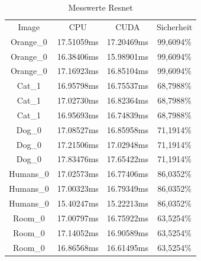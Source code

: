 \begin{table}[H]
	\centering
		\begin{tabular} {c c c c}
	Image & CPU & CUDA & Sicherheit \\
Orange\_0&	17.51059ms  &	17.20469ms&	99,6094\%\\
Orange\_0&	16.38406ms  &	15.98901ms&	99,6094\%\\
Orange\_0&	17.16923ms  &	16.85104ms&	99,6094\%\\
Cat\_1&	16.95798ms  &	16.75537ms&	68,7988\%\\
Cat\_1&	17.02730ms  &	16.82364ms&	68,7988\%\\
Cat\_1&	16.95693ms  &	16.74839ms&	68,7988\%\\
Dog\_0&	17.08527ms  &	16.85958ms&	71,1914\%\\
Dog\_0&	17.21506ms  &	17.02948ms&	71,1914\%\\
Dog\_0&	17.83476ms  &	17.65422ms&	71,1914\%\\
Humans\_0&	17.02573ms  &	16.77406ms&	86,0352\%\\
Humans\_0&	17.00323ms  &	16.79349ms&	86,0352\%\\
Humans\_0&	15.40247ms  &	15.22213ms&	86,0352\%\\
Room\_0&	17.00797ms  &	16.75922ms&	63,5254\%\\
Room\_0&	17.14052ms  &	16.90589ms&	63,5254\%\\
Room\_0&	16.86568ms  &	16.61495ms&	63,5254\%\\
		\end{tabular}
	\caption{Messwerte Resnet}
	\label{Resnet}
\end{table}


